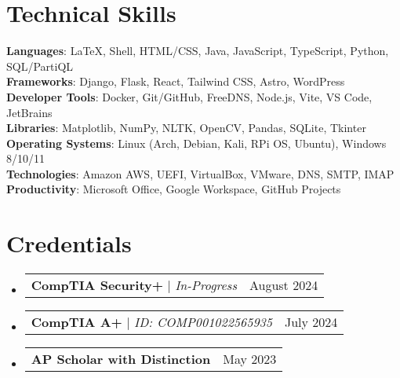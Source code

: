 \documentclass[letterpaper,11pt]{article}
\makeatletter
\newcommand{\resumeProjectHeading}[2]{
    \item
    \begin{tabular*}{0.97\textwidth}{l@{\extracolsep{\fill}}r}
      \small#1 & #2 \\
    \end{tabular*}\vspace{-7pt}
}
\newcommand{\resumeSubHeadingListStart}{\begin{itemize}[leftmargin=0.15in, label={}]}
\newcommand{\resumeSubHeadingListEnd}{\end{itemize}}
\makeatother
\begin{document}
\section{Technical Skills}
 \begin{itemize}[leftmargin=0.15in, label={}]
    \small{\item{
     \textbf{Languages}{: LaTeX, Shell, HTML/CSS, Java, JavaScript, TypeScript, Python, SQL/PartiQL} \\
     \textbf{Frameworks}{: Django, Flask, React, Tailwind CSS, Astro, WordPress} \\
     \textbf{Developer Tools}{: Docker, Git/GitHub, FreeDNS, Node.js, Vite, VS Code, JetBrains} \\
     \textbf{Libraries}{: Matplotlib, NumPy, NLTK, OpenCV, Pandas, SQLite, Tkinter} \\
     \textbf{Operating Systems}{: Linux (Arch, Debian, Kali, RPi OS, Ubuntu), Windows 8/10/11} \\
     \textbf{Technologies}{: Amazon AWS, UEFI, VirtualBox, VMware, DNS, SMTP, IMAP} \\
     \textbf{Productivity}{: Microsoft Office, Google Workspace, GitHub Projects}
    }}
 \end{itemize}

\section{Credentials}
  \resumeSubHeadingListStart
    \resumeProjectHeading
      {\textbf{CompTIA Security+} $|$ \emph{In-Progress}}{August 2024}
    \resumeProjectHeading
      {\textbf{CompTIA A+} $|$ \emph{ID: COMP001022565935}}{July 2024}
    \resumeProjectHeading
      {\textbf{AP Scholar with Distinction}}{May 2023}
  \resumeSubHeadingListEnd



\end{document}
